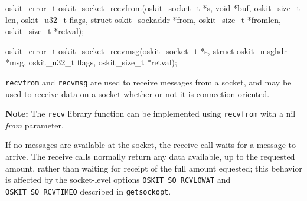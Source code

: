 \begin{apisyn}

	\funcproto oskit_error_t
	oskit_socket_recvfrom(oskit_socket_t *s, 
			    \outparam void *buf,
                            oskit_size_t len, oskit_u32_t flags,
                            \outparam struct oskit_sockaddr *from, 
			    \inoutparam oskit_size_t *fromlen,
                            \outparam oskit_size_t *retval);

        \funcproto oskit_error_t
        oskit_socket_recvmsg(oskit_socket_t *s,
                            \inoutparam struct oskit_msghdr *msg, 
			    oskit_u32_t flags,
                            \outparam oskit_size_t *retval);
\end{apisyn}

\begin{apidesc}
	\texttt{recvfrom} and \texttt{recvmsg} are used to receive messages
	from a socket, and may be used to receive data on a socket whether 
	or not it is connection-oriented.

	\textbf{Note: } The \texttt{recv} library function 
	can be implemented using \texttt{recvfrom} with a nil \emph{from}
	parameter. 

	If no messages are available at the socket, the receive call waits 
	for a message to arrive.
	The receive calls normally return any data available,
	up to the requested amount, rather than waiting for receipt of the 
	full amount equested; this behavior is affected by the socket-level
	options \texttt{OSKIT_SO_RCVLOWAT} and \texttt{OSKIT_SO_RCVTIMEO}
	described in \texttt{getsockopt}.


\end{apidesc}

